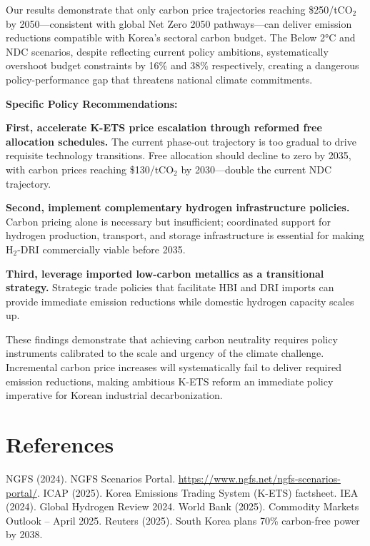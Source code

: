 \documentclass[preprint,5p,authoryear]{elsarticle}
\begin{document}
Our results demonstrate that only carbon price trajectories reaching \$250/tCO$_2$ by 2050—consistent with global Net Zero 2050 pathways—can deliver emission reductions compatible with Korea's sectoral carbon budget. The Below 2°C and NDC scenarios, despite reflecting current policy ambitions, systematically overshoot budget constraints by 16\% and 38\% respectively, creating a dangerous policy-performance gap that threatens national climate commitments.

\textbf{Specific Policy Recommendations:}

\textbf{First, accelerate K-ETS price escalation through reformed free allocation schedules.} The current phase-out trajectory is too gradual to drive requisite technology transitions. Free allocation should decline to zero by 2035, with carbon prices reaching \$130/tCO$_2$ by 2030—double the current NDC trajectory.

\textbf{Second, implement complementary hydrogen infrastructure policies.} Carbon pricing alone is necessary but insufficient; coordinated support for hydrogen production, transport, and storage infrastructure is essential for making H$_2$-DRI commercially viable before 2035.

\textbf{Third, leverage imported low-carbon metallics as a transitional strategy.} Strategic trade policies that facilitate HBI and DRI imports can provide immediate emission reductions while domestic hydrogen capacity scales up.

These findings demonstrate that achieving carbon neutrality requires policy instruments calibrated to the scale and urgency of the climate challenge. Incremental carbon price increases will systematically fail to deliver required emission reductions, making ambitious K-ETS reform an immediate policy imperative for Korean industrial decarbonization.



\section*{References}
\begin{thebibliography}{99}
 NGFS (2024). NGFS Scenarios Portal. \url{https://www.ngfs.net/ngfs-scenarios-portal/}.
 ICAP (2025). Korea Emissions Trading System (K-ETS) factsheet.
 IEA (2024). Global Hydrogen Review 2024.
 World Bank (2025). Commodity Markets Outlook – April 2025.
 Reuters (2025). South Korea plans 70\% carbon-free power by 2038.
\end{thebibliography}
\end{document}
